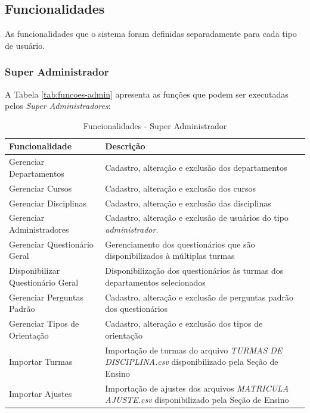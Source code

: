 \documentclass[
  12pt,       %
  openright,      %
  oneside,      %
  a4paper,      %
  english,      %
  french,        %
  spanish,     %
  brazil        %
  ]{abntex2-decsi}
\begin{document}
    \newpage
    
    \subsection{Funcionalidades}

    As funcionalidades que o sistema foram definidas separadamente para cada tipo de usuário.

    \subsubsection{Super Administrador}

    A Tabela \ref{tab:funcoes-admin} apresenta as funções que podem ser executadas pelos \textit{Super Administradores}: 
	
    \begin{table}[h]
    \centering
    \caption{Funcionalidades - Super Administrador}
    \begin{tabular}{p{5cm} p{10cm}}
    \hline
    Funcionalidade & Descrição \\
    \hline
    \hline
    Gerenciar Departamentos & Cadastro, alteração e exclusão dos departamentos\\
    \hline
    Gerenciar Cursos & Cadastro, alteração e exclusão dos cursos\\
    \hline
    Gerenciar Disciplinas & Cadastro, alteração e exclusão das disciplinas\\
    \hline
    Gerenciar Administradores & Cadastro, alteração e exclusão de usuários do tipo \textit{administrador}.\\
    \hline
    Gerenciar Questionário Geral & Gerenciamento dos questionários que são disponibilizados à múltiplas turmas\\
    \hline
    Disponibilizar Questionário Geral & Disponibilização dos questionários às turmas dos departamentos selecionados\\
    \hline
    Gerenciar Perguntas Padrão & Cadastro, alteração e exclusão de perguntas padrão dos questionários\\
    \hline
    Gerenciar Tipos de Orientação & Cadastro, alteração e exclusão dos tipos de orientação\\
    \hline
    Importar Turmas  & Importação de turmas do arquivo \textit{TURMAS DE DISCIPLINA.csv} disponibilizado pela Seção de Ensino \\
    \hline
    Importar Ajustes & Importação de ajustes dos arquivos \textit{MATRICULA AJUSTE.csv} disponibilizado pela Seção de Ensino \\

\end{tabular}
\end{table}
\end{document}
